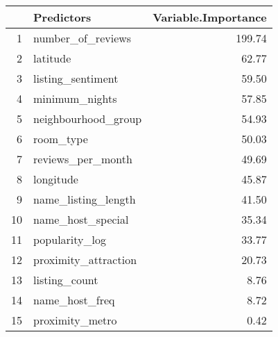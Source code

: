 \begin{table}[ht]
\centering
\begin{tabular}{rlr}
  \hline
 & Predictors & Variable.Importance \\ 
  \hline
1 & number\_of\_reviews & 199.74 \\ 
  2 & latitude & 62.77 \\ 
  3 & listing\_sentiment & 59.50 \\ 
  4 & minimum\_nights & 57.85 \\ 
  5 & neighbourhood\_group & 54.93 \\ 
  6 & room\_type & 50.03 \\ 
  7 & reviews\_per\_month & 49.69 \\ 
  8 & longitude & 45.87 \\ 
  9 & name\_listing\_length & 41.50 \\ 
  10 & name\_host\_special & 35.34 \\ 
  11 & popularity\_log & 33.77 \\ 
  12 & proximity\_attraction & 20.73 \\ 
  13 & listing\_count & 8.76 \\ 
  14 & name\_host\_freq & 8.72 \\ 
  15 & proximity\_metro & 0.42 \\ 
   \hline
\end{tabular}
\end{table}
